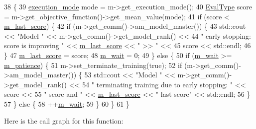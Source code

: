\begin{DoxyCode}
38                                                               \{
39   \hyperlink{base_8hpp_a2781a159088df64ed7d47cc91c4dc0a8}{execution\_mode} mode = m->get\_execution\_mode();
40   \hyperlink{base_8hpp_a3266f5ac18504bbadea983c109566867}{EvalType} score = m->get\_objective\_function()->get\_mean\_value(mode);
41   \textcolor{keywordflow}{if} (score < \hyperlink{classlbann_1_1lbann__callback__early__stopping_a64868be121d63a94344023b466cec494}{m\_last\_score}) \{
42     \textcolor{keywordflow}{if} (m->get\_comm()->am\_model\_master()) \{
43       std::cout << \textcolor{stringliteral}{"Model "} << m->get\_comm()->get\_model\_rank() <<
44         \textcolor{stringliteral}{" early stopping: score is improving "} << \hyperlink{classlbann_1_1lbann__callback__early__stopping_a64868be121d63a94344023b466cec494}{m\_last\_score} << \textcolor{stringliteral}{" >> "} <<
45         score << std::endl;
46     \}
47     \hyperlink{classlbann_1_1lbann__callback__early__stopping_a64868be121d63a94344023b466cec494}{m\_last\_score} = score;
48     \hyperlink{classlbann_1_1lbann__callback__early__stopping_acd0363fdc85a9ab0a77687ecfa827a1e}{m\_wait} = 0;
49   \} \textcolor{keywordflow}{else} \{
50     \textcolor{keywordflow}{if} (\hyperlink{classlbann_1_1lbann__callback__early__stopping_acd0363fdc85a9ab0a77687ecfa827a1e}{m\_wait} >= \hyperlink{classlbann_1_1lbann__callback__early__stopping_ada95898e18dbed5adf1848919affd6ee}{m\_patience}) \{
51       m->set\_terminate\_training(\textcolor{keyword}{true});
52       \textcolor{keywordflow}{if} (m->get\_comm()->am\_model\_master()) \{
53         std::cout << \textcolor{stringliteral}{"Model "} << m->get\_comm()->get\_model\_rank() <<
54           \textcolor{stringliteral}{" terminating training due to early stopping: "} << score <<
55           \textcolor{stringliteral}{" score and "} << \hyperlink{classlbann_1_1lbann__callback__early__stopping_a64868be121d63a94344023b466cec494}{m\_last\_score} << \textcolor{stringliteral}{" last score"} << std::endl;
56       \}
57     \} \textcolor{keywordflow}{else} \{
58       ++\hyperlink{classlbann_1_1lbann__callback__early__stopping_acd0363fdc85a9ab0a77687ecfa827a1e}{m\_wait};
59     \}
60   \}
61 \}
\end{DoxyCode}
Here is the call graph for this function\+:\nopagebreak
